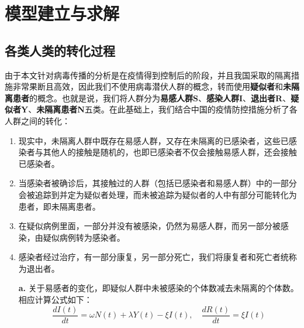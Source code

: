 \documentclass[UTF8]{ctexart}
\begin{document}
\newpage


	\section{模型建立与求解}
		\subsection{各类人类的转化过程}
		
		由于本文针对病毒传播的分析是在疫情得到控制后的阶段，并且我国采取的隔离措施非常果断且高效，因此我们不使用病毒潜伏人群的概念，转而使用\textbf{疑似者}和\textbf{未隔离患者}的概念。也就是说，我们将人群分为\textbf{易感人群S}、\textbf{感染人群I}、\textbf{退出者R}、\textbf{疑似者Y}、\textbf{未隔离患者N}五类。在此基础上，我们结合中国的疫情防控措施分析了各人群之间的转化：
 		\begin{enumerate}[1)]
		\item 现实中，未隔离人群中既存在易感人群，又存在未隔离的已感染者，这些已感染者与其他人的接触是随机的，也即已感染者不仅会接触易感人群，还会接触已感染者。
\vspace{-0.5ex}
		\item 当感染者被确诊后，其接触过的人群（包括已感染者和易感人群）中的一部分会被追踪到并定为疑似者处理，而未被追踪为疑似者的人中有部分可能转化为患者，即未隔离患者。\vspace{-0.5ex}
		\item 在疑似病例里面，一部分并没有被感染，仍然为易感人群，而另一部分被感染，由疑似病例转为感染者。\vspace{-0.5ex}
		\item 感染者经过治疗，有一部分康复，另一部分死亡，我们将康复者和死亡者统称为退出者。
		\end{enumerate}


		\vspace{4pt}
		\begin{itemize}
			\item[\textbf{a.}]关于易感者的变化，即疑似人群中未被感染的个体数减去未隔离的个体数。相应计算公式如下：\vspace{1ex}
			\begin{equation}
			\frac{dI(t)}{dt} = \omega N(t) +\lambda Y(t) -\xi I(t),
			\quad\frac{dR(t)}{dt} =\xi I(t)
			\end{equation}



		\end{itemize}
	
\end{document}

